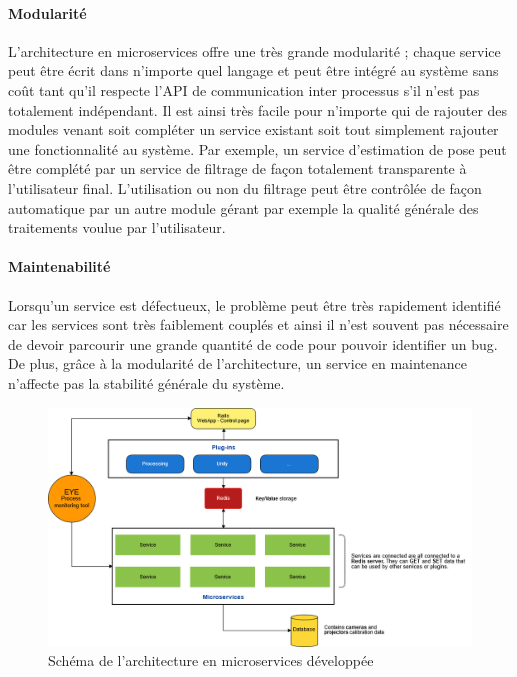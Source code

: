 \paragraph{Modularité} L'architecture en microservices offre une très grande modularité ; chaque service peut être écrit dans n'importe quel langage et peut être intégré au système sans coût tant qu'il respecte l'API de communication inter processus s'il n'est pas totalement indépendant. Il est ainsi très facile pour n'importe qui de rajouter des modules venant soit compléter un service existant soit tout simplement rajouter une fonctionnalité au système. Par exemple, un service d'estimation de pose peut être complété par un service de filtrage de façon totalement transparente à l'utilisateur final. L'utilisation ou non du filtrage peut être contrôlée de façon automatique par un autre module gérant par exemple la qualité générale des traitements voulue par l'utilisateur.

\paragraph{Maintenabilité} Lorsqu'un service est défectueux, le problème peut être très rapidement identifié car les services sont très faiblement couplés et ainsi il n'est souvent pas nécessaire de devoir parcourir une grande quantité de code pour pouvoir identifier un bug. De plus, grâce à la modularité de l'architecture, un service en maintenance n'affecte pas la stabilité générale du système.

\begin{figure}[H]
\centering
\includegraphics[width=\linewidth]{images/archi3}
\caption{Schéma de l'architecture en microservices développée}
\label{fig:microarchi}
\end{figure} 

